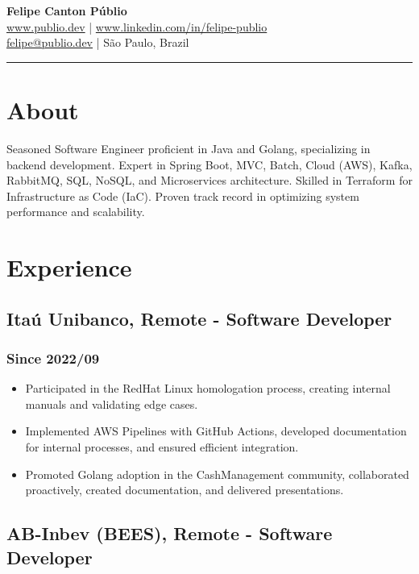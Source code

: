 \documentclass[a4paper,10pt]{article}
\begin{document}
\pagestyle{empty}

\begin{center}
    {\Huge \textbf{Felipe Canton Públio}} \\
    \vspace{4mm}
    \href{https://www.publio.dev}{www.publio.dev} | \href{https://www.linkedin.com/in/felipe-publio}{www.linkedin.com/in/felipe-publio} \\
    \vspace{2mm}
    \href{mailto:felipe@publio.dev}{felipe@publio.dev} | São Paulo, Brazil
\end{center}
\hrule %

\section*{About}
Seasoned Software Engineer proficient in Java and Golang, specializing in backend development. Expert in Spring Boot, MVC, Batch, Cloud (AWS), Kafka, RabbitMQ, SQL, NoSQL, and Microservices architecture. Skilled in Terraform for Infrastructure as Code (IaC). Proven track record in optimizing system performance and scalability.

\section*{Experience}

\subsection*{Itaú Unibanco, Remote - Software Developer}
\subsubsection*{Since 2022/09}
\begin{itemize}
    \item Participated in the RedHat Linux homologation process, creating internal manuals and validating edge cases.
    \item Implemented AWS Pipelines with GitHub Actions, developed documentation for internal processes, and ensured efficient integration.
    \item Promoted Golang adoption in the CashManagement community, collaborated proactively, created documentation, and delivered presentations.
\end{itemize}

\subsection*{AB-Inbev (BEES), Remote - Software Developer}
\end{document}
